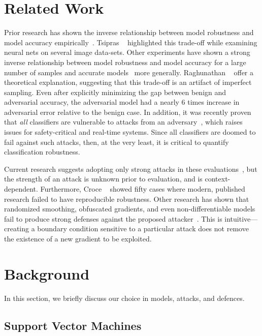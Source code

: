 \documentclass[fonts]{icst}
\begin{document}
\section{Related Work}

Prior research has shown the inverse relationship between model robustness and model accuracy empirically~\cite{li2016general,tsipras2018robustness}.
Tsipras ~\cite{tsipras2018robustness} highlighted this trade-off while examining neural nets on several image data-sets.
Other experiments have shown a strong inverse relationship between model robustness and model accuracy for a large number of samples and accurate models~\cite{raghunathan2020understanding} more generally.
Raghunathan ~\cite{raghunathan2020understanding} offer a theoretical explanation, suggesting that this trade-off is an artifact of imperfect sampling.
Even after explicitly minimizing the gap between benign and adversarial accuracy, the adversarial model had a nearly 6 times increase in adversarial error relative to the benign case.
In addition, it was recently proven that \textit{all} classifiers are vulnerable to attacks from an adversary~\cite{dohmatob2019generalized}, which raises issues for safety-critical and real-time systems.
Since all classifiers are doomed to fail against such attacks, then, at the very least, it is critical to quantify classification robustness.

Current research suggests adopting only strong attacks in these evaluations~\cite{carlini2019evaluating}, but the strength of an attack is unknown prior to evaluation, and is context-dependent.
Furthermore, Croce ~\cite{croce2020reliable} showed fifty cases where modern, published research failed to have reproducible robustness.
Other research has shown that randomized smoothing, obfuscated gradients, and even non-differentiable models fail to produce strong defenses against the proposed attacker~\cite{carlini2017towards,athalye2018obfuscated,uesato2018adversarial}.
This is intuitive---creating a boundary condition sensitive to a particular attack does not remove the existence of a new gradient to be exploited.


\section{Background}
In this section, we briefly discuss our choice in models, attacks, and defences.
\subsection{Support Vector Machines}
\end{document}
